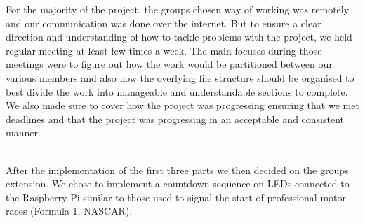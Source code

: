 For the majority of the project, the groups chosen way of working was remotely and our communication was done over the internet. But to ensure a clear direction and understanding of how to tackle problems with the project, we held regular meeting at least few times a week. The main focuses during those meetings were to figure out how the work would be partitioned between our various members and also how the overlying file structure should be organised to best divide the work into manageable and understandable sections to complete. We also made sure to cover how the project was progressing ensuring that we met deadlines and that the project was progressing in an acceptable and consistent manner.

~\\

After the implementation of the first three parts we then decided on the groups extension. We chose to implement a countdown sequence on LEDs connected to the Raspberry Pi similar to those used to signal the start of professional motor races (Formula 1, NASCAR).
